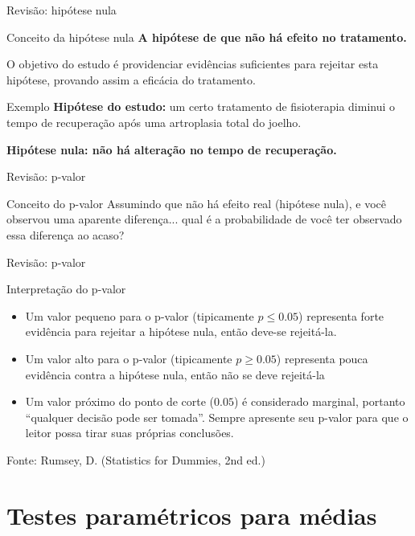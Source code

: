 \documentclass{beamer}
\begin{document}
\begin{frame}{Revisão: hipótese nula}
  \begin{block}{Conceito da hipótese nula}
    {\bf A hipótese de que não há efeito no tratamento.}

    \bigskip
    O objetivo do estudo é providenciar evidências suficientes para rejeitar esta hipótese, provando assim a eficácia do tratamento.
  \end{block}
  \begin{exampleblock}{Exemplo}
    {\bf Hipótese do estudo:} um certo tratamento de fisioterapia diminui o tempo de recuperação após uma artroplasia total do joelho.

    \bigskip
    {\bf Hipótese nula: não há alteração no tempo de recuperação.}
  \end{exampleblock}
\end{frame}

\begin{frame}{Revisão: p-valor}
  \begin{block}{Conceito do p-valor}
    Assumindo que não há efeito real (hipótese nula), e você observou uma aparente diferença... qual é a probabilidade de você ter observado essa diferença ao acaso?
  \end{block}
\end{frame}

\begin{frame}{Revisão: p-valor}
\begin{block}{Interpretação do p-valor}
  \begin{itemize}
  \item Um valor pequeno para o p-valor (tipicamente $p \le 0.05$)
    representa forte evidência para rejeitar a hipótese nula, então
    deve-se rejeitá-la.
  \item Um valor alto para o p-valor (tipicamente $p \ge 0.05$)
    representa pouca evidência contra a hipótese nula, então não se
    deve rejeitá-la
  \item Um valor próximo do ponto de corte ($0.05$) é considerado
    marginal, portanto ``qualquer decisão pode ser tomada''. Sempre
    apresente seu p-valor para que o leitor possa tirar suas próprias
    conclusões.
  \end{itemize}
\end{block}
Fonte: Rumsey, D. (Statistics for Dummies, 2nd ed.)
\end{frame}

\section{Testes paramétricos para médias}
\end{document}
